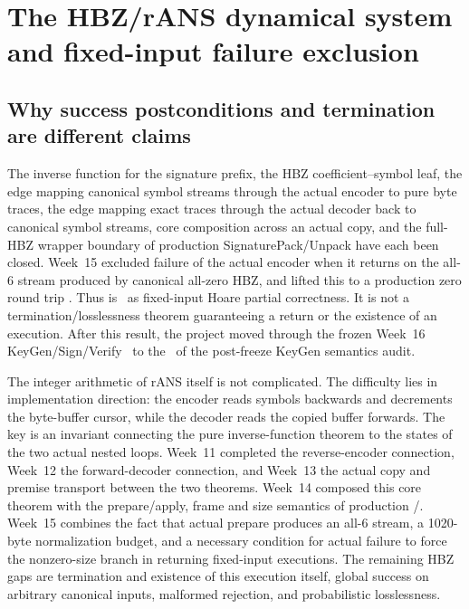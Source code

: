 \section{The HBZ/rANS dynamical system and fixed-input failure exclusion}
\label{sec:rans-frontier}

\subsection{Why success postconditions and termination are different claims}

The inverse function for the signature prefix, the HBZ coefficient--symbol leaf,
the edge mapping canonical symbol streams through the actual encoder to pure byte
traces, the edge mapping exact traces through the actual decoder back to canonical
symbol streams, core composition across an actual copy, and the full-HBZ wrapper
boundary of production SignaturePack/Unpack have each been closed.
Week~15 excluded failure of the actual encoder when it returns on the all-6
stream produced by canonical all-zero HBZ, and lifted this to a production zero
round trip \cite{week15-report,rans-actual-success-witness}. Thus
 is \statusproved\ as fixed-input Hoare
partial correctness. It is not a termination/losslessness theorem guaranteeing
a return or the existence of an execution. After this result, the project moved
through the frozen Week~16 KeyGen/Sign/Verify \FrozenPaperGate\ to the
\CurrentGate\ of the post-freeze KeyGen semantics audit.

The integer arithmetic of rANS itself is not complicated. The difficulty lies
in implementation direction: the encoder reads symbols backwards and decrements
the byte-buffer cursor, while the decoder reads the copied buffer forwards.
The key is an invariant connecting the pure inverse-function theorem to the
states of the two actual nested loops. Week~11 completed the reverse-encoder
connection, Week~12 the forward-decoder connection, and Week~13 the actual copy
and premise transport between the two theorems. Week~14 composed this core
theorem with the prepare/apply, frame and size semantics of production
/.
Week~15 combines the fact that actual prepare produces an all-6 stream, a
1020-byte normalization budget, and a necessary condition for actual failure
to force the nonzero-size branch in returning fixed-input executions.
The remaining HBZ gaps are termination and existence of this execution itself,
global success on arbitrary canonical inputs, malformed rejection, and
probabilistic losslessness.

